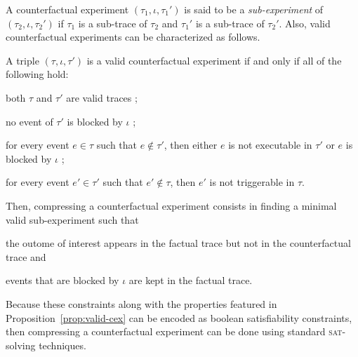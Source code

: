 A counterfactual experiment $(\tau_1, \iota, \tau_1')$ is said to be a
\emph{sub-experiment} of $(\tau_2, \iota, \tau_2')$ if $\tau_1$ is a
sub-trace of $\tau_2$ and $\tau_1'$ is a sub-trace of $\tau_2'$. Also,
valid counterfactual experiments can be characterized as follows.

\begin{proposition}%
  \label{prop:valid-cex}
  A triple $(\tau, \iota, \tau')$ is a valid counterfactual experiment if
  and only if all of the following hold:
  \begin{inparaenum}[(1)]
  \item \label{valid-cex:valid-traces} both $\tau$ and $\tau'$ are
    valid traces ;
  \item \label{valid-cex:no-blocking} no event of $\tau'$ is blocked
    by $\iota$ ;
  \item \label{valid-cex:co-occur} for every event $e \in \tau$
    such that $e \notin \tau'$, then either $e$ is not
    executable in $\tau'$ or $e$ is blocked by
    $\iota$ ;
  \item \label{valid-cex:co-occur2} for every event $e' \in \tau'$
    such that $e' \notin \tau$, then $e'$ is not triggerable in
    $\tau$.
  \end{inparaenum}
\end{proposition}

\noindent Then, compressing a counterfactual experiment consists
in finding a minimal valid sub-experiment such that
\begin{inparaenum}[(i)]
\item the outome of interest appears in the factual trace but not in
the counterfactual trace and
\item events that are blocked by $\iota$ are kept in the factual trace.
\end{inparaenum}
Because these constraints along with the properties featured in
Proposition~\ref{prop:valid-cex} can be encoded as boolean
satisfiability constraints, then compressing a counterfactual
experiment can be done using standard \textsc{sat}-solving techniques.

